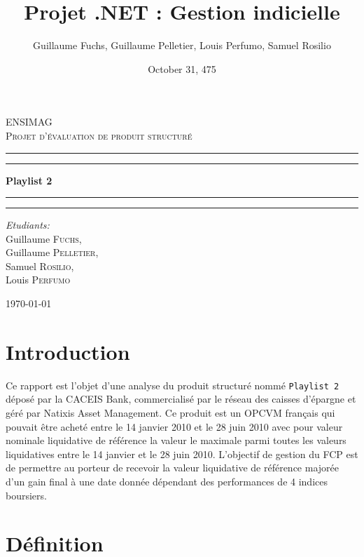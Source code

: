 \documentclass[french,12pt,a4paper]{article}
\title{Projet .NET : Gestion indicielle}
\date{October 31, 475}
\author{Guillaume Fuchs, Guillaume Pelletier, Louis Perfumo, Samuel Rosilio}
\begin{document}
\begin{titlepage}
\begin{center}

\textsc{\LARGE ENSIMAG}\\[1.5cm]

\textsc{\Large Projet d'évaluation de produit structuré}\\[0.5cm]

 \hrule
 \hrule 

\vspace{7mm}
{ \huge \bfseries Playlist 2  }

\vspace{7mm}
\hrule
\hrule

\vspace{7mm}
\begin{minipage}{0.4\textwidth}
\begin{flushleft} \large
\emph{Etudiants:}\\
Guillaume \textsc{Fuchs},\\
Guillaume \textsc{Pelletier},\\
Samuel \textsc{Rosilio},\\
Louis \textsc{Perfumo}
\end{flushleft}
\end{minipage}

\vfill

{\large \today}

\end{center}
\end{titlepage}
\tableofcontents
\newpage

\section{Introduction}

Ce rapport est l'objet d'une analyse du produit structuré nommé \lstinline!Playlist 2! déposé par  la CACEIS Bank, commercialisé par le réseau des caisses d'épargne et géré par Natixis Asset Management.
Ce produit est un OPCVM français qui pouvait être acheté entre le 14 janvier 2010 et le 28 juin 2010 avec pour valeur nominale liquidative de référence la valeur le maximale parmi toutes les valeurs liquidatives entre le 14 janvier et le 28 juin 2010. L'objectif de gestion du FCP est de permettre au porteur de recevoir la valeur liquidative de référence majorée d'un gain final à une date donnée dépendant des performances de 4 indices boursiers. 


\section{Définition}
\end{document}
